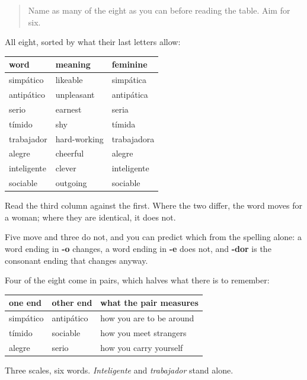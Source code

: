 \label{lesson:ES-C423-repaso-caracter}



\begin{quote}
Name as many of the eight as you can before reading the table. Aim for six.
\end{quote}

\begin{grammarlens}[title={Grammar Lens: the ending decides whether the word can move}]
All eight, sorted by what their last letters allow:

\noindent
\begin{tabularx}{\linewidth}{@{}>{\raggedright\arraybackslash}X>{\raggedright\arraybackslash}X>{\raggedright\arraybackslash}X@{}}
\toprule
\textbf{word} & \textbf{meaning} & \textbf{feminine} \\
\midrule
simpático & likeable & simpática \\
antipático & unpleasant & antipática \\
serio & earnest & seria \\
tímido & shy & tímida \\
trabajador & hard-working & trabajadora \\
alegre & cheerful & alegre \\
inteligente & clever & inteligente \\
sociable & outgoing & sociable \\
\bottomrule
\end{tabularx}

Read the third column against the first. Where the two differ, the word moves for a woman; where they are identical, it does not.

Five move and three do not, and you can predict which from the spelling alone: a word ending in \textbf{-o} changes, a word ending in \textbf{-e} does not, and \textbf{-dor} is the consonant ending that changes anyway.
\end{grammarlens}

\begin{grammarlens}[title={Grammar Lens: two of them are matched opposites}]
Four of the eight come in pairs, which halves what there is to remember:

\noindent
\begin{tabularx}{\linewidth}{@{}>{\raggedright\arraybackslash}X>{\raggedright\arraybackslash}X>{\raggedright\arraybackslash}X@{}}
\toprule
\textbf{one end} & \textbf{other end} & \textbf{what the pair measures} \\
\midrule
simpático & antipático & how you are to be around \\
tímido & sociable & how you meet strangers \\
alegre & serio & how you carry yourself \\
\bottomrule
\end{tabularx}

Three scales, six words. \emph{Inteligente} and \emph{trabajador} stand alone.
\end{grammarlens}

